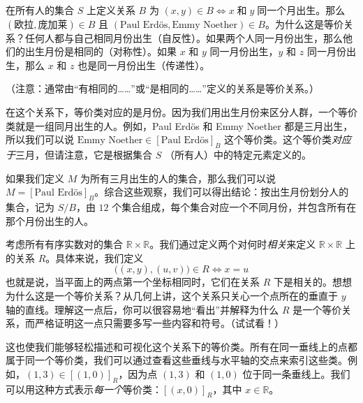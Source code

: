 \begin{example}
    在所有人的集合 $S$ 上定义关系 $B$ 为 $(x, y) \in B \iff x \;\text{和}\; y \;\text{同一个月出生}$。那么 $(\text{欧拉}, \text{庞加莱}) \in B$ 且 $(\text{Paul Erdös}, \text{Emmy Noether}) \in B$。为什么这是等价关系？任何人都与自己相同月份出生（自反性）。如果两个人同一月份出生，那么他们的出生月份是相同的（对称性）。如果 $x$ 和 $y$ 同一月份出生，$y$ 和 $z$ 同一月份出生，那么 $x$ 和 $z$ 也是同一月份出生（传递性）。

    （注意：通常由``有相同的……''或``是相同的……''定义的关系是等价关系。）

    在这个关系下，等价类对应的是月份。因为我们用出生月份来区分人群，一个等价类就是一组同月出生的人。例如，Paul Erdös 和 Emmy Noether 都是三月出生，所以我们可以说 $\text{Emmy Noether} \in [\text{Paul Erdös}]_B$ 这个等价类。这个等价类\emph{对应于}三月，但请注意，它是根据集合 $S$ （所有人）中的特定元素定义的。

    如果我们定义 $M$ 为所有三月出生的人的集合，那么我们可以说 $M = [\text{Paul Erdös}]_B$。综合这些观察，我们可以得出结论：按出生月份划分人的集合，记为 $S/B$，由 $12$ 个集合组成，每个集合对应一个不同月份，并包含所有在那个月份出生的人。
\end{example}

\begin{example}
    考虑所有有序实数对的集合 $\mathbb{R} \times \mathbb{R}$。我们通过定义两个对何时\emph{相关}来定义 $\mathbb{R} \times \mathbb{R}$ 上的关系 $R$。具体来说，我们定义
    \[\big((x, y),(u, v)\big) \in R \iff x = u\]
    也就是说，当平面上的两点第一个坐标相同时，它们在关系 $R$ 下是相关的。想想为什么这是一个等价关系？从几何上讲，这个关系只关心一个点所在的垂直于 $y$ 轴的直线。理解这一点后，你可以很容易地``看出''并解释为什么 $R$ 是一个等价关系，而严格证明这一点只需要多写一些内容和符号。（试试看！）

    这也使我们能够轻松描述和可视化这个关系下的等价类。所有在同一垂线上的点都属于同一个等价类，我们可以通过查看这些垂线与水平轴的交点来索引这些类。例如，$(1, 3) \in [(1, 0)]_R$，因为点 $(1, 3)$ 和 $(1, 0)$ 位于同一条垂线上。我们可以用这种方式表示\emph{每一个}等价类：$[(x, 0)]_R$，其中 $x \in \mathbb{R}$。
\end{example}

\begin{center}
    {}
\end{center}

